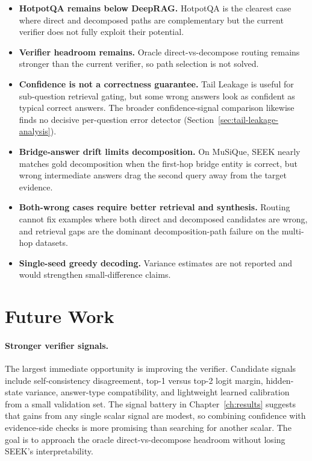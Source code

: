 \documentclass{nthu_thesis}
\begin{document}
\begin{thesiscjk}
\begin{itemize}
    \item \textbf{HotpotQA remains below DeepRAG.} HotpotQA is the clearest case where direct and decomposed paths are complementary but the current verifier does not fully exploit their potential.
    \item \textbf{Verifier headroom remains.} Oracle direct-vs-decompose routing remains stronger than the current verifier, so path selection is not solved.
    \item \textbf{Confidence is not a correctness guarantee.} Tail Leakage is useful for sub-question retrieval gating, but some wrong answers look as confident as typical correct answers. The broader confidence-signal comparison likewise finds no decisive per-question error detector (Section~\ref{sec:tail-leakage-analysis}).
    \item \textbf{Bridge-answer drift limits decomposition.} On MuSiQue, SEEK nearly matches gold decomposition when the first-hop bridge entity is correct, but wrong intermediate answers drag the second query away from the target evidence.
    \item \textbf{Both-wrong cases require better retrieval and synthesis.} Routing cannot fix examples where both direct and decomposed candidates are wrong, and retrieval gaps are the dominant decomposition-path failure on the multi-hop datasets.
    \item \textbf{Single-seed greedy decoding.} Variance estimates are not reported and would strengthen small-difference claims.
\end{itemize}

\section{Future Work}

\paragraph{Stronger verifier signals.} The largest immediate opportunity is improving the verifier. Candidate signals include self-consistency disagreement, top-1 versus top-2 logit margin, hidden-state variance, answer-type compatibility, and lightweight learned calibration from a small validation set. The signal battery in Chapter~\ref{ch:results} suggests that gains from any single scalar signal are modest, so combining confidence with evidence-side checks is more promising than searching for another scalar. The goal is to approach the oracle direct-vs-decompose headroom without losing SEEK's interpretability.


\end{thesiscjk}
\end{document}
